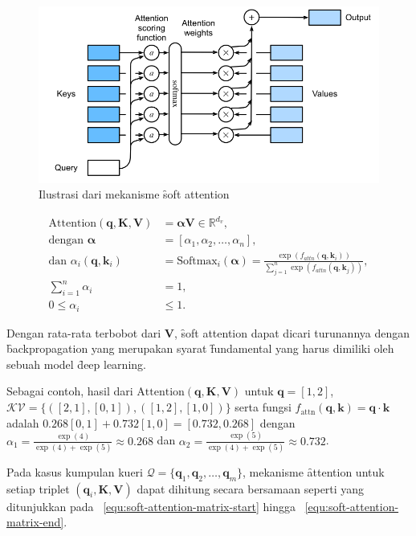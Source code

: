 	\begin{figure}
		\centering
		\includegraphics[width=1\textwidth]{assets/pics/softattention.png}
		\caption{Ilustrasi dari mekanisme \f{soft attention} \citep{zhang2023dive}}
		\label{fig:soft-attention}
	\end{figure}

	\begin{align}
		\label{equ:soft-attention-start}
		\text{Attention}(\mathbf{q}, \mathbf{K}, \mathbf{V}) &= \mathbf{\alpha}\mathbf{V} \in \mathbb{R}^{d_v},\\
		\text{dengan } \bm{\alpha} &= [\alpha_{1}, \alpha_{2}, \dots, \alpha_{n}], \\
		\text{dan } \alpha_{i}(\mathbf{q},\mathbf{k}_i) &= \text{Softmax}_i(\bm{\alpha}) = \frac{\exp(f_{attn}(\mathbf{q}, \mathbf{k}_i))}{\sum_{j=1}^{n} \exp(f_{attn}(\mathbf{q}, \mathbf{k}_j))}, \\
		\sum_{i=1}^{n} \alpha_{i} &= 1, \\
		\label{equ:soft-attention-end}
		0 \leq \alpha_{i} &\leq 1.
	\end{align}

	Dengan rata-rata terbobot dari $\mathbf{V}$, \f{soft attention} dapat dicari turunannya dengan \f{backpropagation} yang merupakan syarat \f{fundamental} yang harus dimiliki oleh sebuah model \f{deep learning}.

	Sebagai contoh, hasil dari $\text{Attention}(\mathbf{q}, \mathbf{K}, \mathbf{V})$ untuk $\mathbf{q}= [1,2]$, $\mathcal{KV} = \{([2,1],[0,1]), ([1,2],[1,0])\}$ serta fungsi $f_\text{attn}(\mathbf{q}, \mathbf{k}) =\mathbf{q}\cdot \mathbf{k}$ adalah $0.268 [0,1] + 0.732 [1,0] = [0.732, 0.268]$ dengan $\alpha_1 = \frac{\exp(4)}{\exp(4) + \exp(5)} \approx 0.268$ dan $\alpha_2 = \frac{\exp(5)}{\exp(4) + \exp(5)} \approx 0.732$.

	Pada kasus kumpulan kueri $\mathcal{Q} = \{\mathbf{q}_1, \mathbf{q}_2, \dots, \mathbf{q}_m\}$, mekanisme \f{attention} untuk setiap triplet $(\mathbf{q}_i, \mathbf{K}, \mathbf{V})$ dapat dihitung secara bersamaan seperti yang ditunjukkan pada \equ~\ref{equ:soft-attention-matrix-start} hingga \equ~\ref{equ:soft-attention-matrix-end}.

